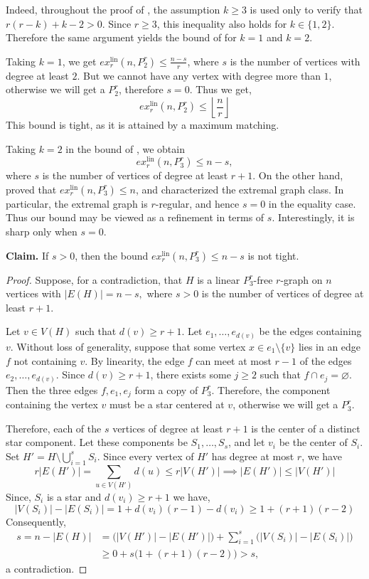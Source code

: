 \documentclass[12pt]{article}
\begin{document}
Indeed, throughout the proof of , the assumption $k\ge 3$ is used only
to verify that $r(r-k)+k-2>0$.
Since $r\ge 3$, this inequality also holds for $k\in\{1,2\}$. Therefore the same
argument yields the bound of  for $k=1$ and $k=2$.
\begin{remark}
    Taking $k =1$, we get
    $ex_r^{\mathrm{lin}}(n,P^r_2) \leq \frac{n-s}{r}$, where $s$ is the number of vertices with degree at least $2$. But we cannot have any vertex with degree more than $1$, otherwise we will get a $P^r_2$, therefore $s=0$. Thus we get,
    $$ex_r^{\mathrm{lin}}(n,P^r_2) \leq \left\lfloor\frac{n}{r}\right\rfloor$$ This bound is tight, as it is attained by a maximum matching.
\end{remark}

\begin{remark}
Taking $k=2$ in the bound of , we obtain
$$ex_r^{\mathrm{lin}}(n,P_3^r)\le n-s,$$
where $s$ is the number of vertices of degree at least $r+1$.
On the other hand, \cite{zhang2025linear} proved that $ex_r^{\mathrm{lin}}(n,P_3^r)\le n$,
 and characterized the extremal graph class. In particular, the extremal graph is $r$-regular, and hence
$s=0$ in the equality case. Thus our bound may be viewed as a refinement in terms of $s$.
Interestingly, it is sharp only when $s=0$.

\medskip
\noindent\textbf{Claim.}
If $s>0$, then the bound $ex_r^{\mathrm{lin}}(n,P_3^r)\le n-s$ is not tight.

\begin{proof}
Suppose, for a contradiction, that $H$ is a linear $P_3^r$-free $r$-graph on $n$ vertices with
$|E(H)|=n-s,$ where $s>0$ is the number of vertices of degree at least $r+1$.

Let $v \in V(H)$ such that $d(v) \geq r+1$. Let $e_1,\dots,e_{d(v)}$ be the edges containing $v$. Without loss of generality, suppose that some vertex
$x\in e_1\setminus\{v\}$ lies in an edge $f$ not containing $v$. By linearity,
the edge $f$ can meet at most $r-1$ of the edges $e_2,\dots,e_{d(v)}$. Since
$d(v)\ge r+1$, there exists some $j\ge 2$ such that $f\cap e_j=\varnothing$.
Then the three edges $f,e_1,e_j$ form a copy of $P_3^r$. Therefore, the component containing the vertex $v$ must be a star centered at $v$, otherwise we will get a $P_3^r$. 

Therefore, each of the $s$ vertices of degree at least $r+1$ is the center of a distinct star
component. Let these components be $S_1,\dots,S_s$, and let $v_i$ be the center of $S_i$.
Set $H' = H \setminus \bigcup_{i=1}^s S_i$.
Since every vertex of $H'$ has degree at most $r$, we have $$r|E(H')|=\sum_{u\in V(H')} d(u)\le r|V(H')| \implies |E(H')|\le |V(H')|$$
Since, $S_i$ is a star and $d(v_i) \geq r+1$ we have,
$$|V(S_i)|-|E(S_i)| = 1+d(v_i)(r-1) - d(v_i) \ge 1+(r+1)(r-2)$$
Consequently,
$$
\begin{aligned}
s
= n-|E(H)|
&= \bigl(|V(H')|-|E(H')|\bigr)+\sum_{i=1}^s \bigl(|V(S_i)|-|E(S_i)|\bigr) \\
&\ge 0+s\bigl(1+(r+1)(r-2)\bigr)
> s,
\end{aligned}
$$
a contradiction.
\end{proof}
\end{remark}
\end{document}
